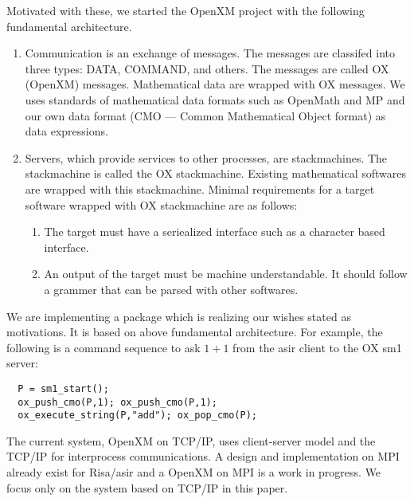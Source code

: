 Motivated with these, we started the OpenXM project with the following
fundamental architecture.
\begin{enumerate}
\item Communication is an exchange of messages. The messages are classifed into
three types:
DATA, COMMAND, and others.
The messages are called OX (OpenXM) messages.
Mathematical data are wrapped with OX messages.
We uses standards of mathematical data formats such as OpenMath and MP
and our own data format (CMO --- Common Mathematical Object format)
as data expressions.
\item Servers, which provide services to other processes, are stackmachines.
The stackmachine is called the
OX stackmachine.
Existing mathematical softwares are wrapped with this stackmachine.
Minimal requirements for a target software wrapped with OX stackmachine
are as follows:
\begin{enumerate}
\item The target must have a seriealized interface such as a character based
interface.
\item An output of the target must be machine understandable.
It should follow a grammer that can be parsed with other softwares.
\end{enumerate}
\end{enumerate}
We are implementing a package which is realizing our wishes stated as motivations.
It is based on above fundamental architecture.
For example, the following is a command sequence to ask $1+1$ from
the asir client to the OX sm1 server:
\begin{verbatim}
  P = sm1_start();
  ox_push_cmo(P,1); ox_push_cmo(P,1);
  ox_execute_string(P,"add"); ox_pop_cmo(P);
\end{verbatim}
The current system, OpenXM on TCP/IP, 
uses client-server model and the TCP/IP for interprocess
communications.
A design and implementation on MPI already exist for Risa/asir and
a OpenXM on MPI is a work in progress.
We focus only on the system based on TCP/IP in this paper.



